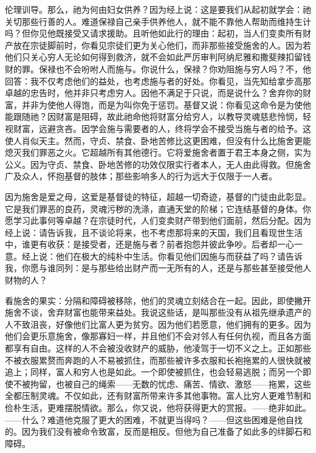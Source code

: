 伦理训导。那么，祂为何由妇女供养？因为经上说：这是要我们从起初就学会：祂关切那些行善的人。难道保禄自己亲手供养他人，就不能不靠他人帮助而维持生计吗？但你见他既接受又请求援助。且听他如此行的理由：起初，当人们变卖所有财产放在宗徒脚前时，你看见宗徒们更为关心他们，而非那些接受施舍的人。因为若他们只关心穷人无论如何得到救济，就不会如此严厉审判阿纳尼雅和撒斐辣扣留钱财的罪。保禄也不会吩咐人而施与。你说什么，保禄？你劝阻施与穷人吗？不，他回答：我不仅考虑他们的益处，也考虑施与者的好处。你看见，当先知给拿步高那卓越的忠告时，他并非只考虑穷人。因他不满足于只说，而是说什么？舍弃你的财富，并非为使他人得饱，而是为叫你免于惩罚。基督又说：你看见这命令是为使他能跟随祂？因财富是阻碍，故此祂命他将财富分给穷人，以教导灵魂慈悲怜悯，轻视财富，远避贪吝。因学会施与需要者的人，终将学会不接受当施与者的给予。这使人肖似天主。然而，守贞、禁食、卧地苦修比这更困难，但没有什么比施舍更能熄灭我们罪恶之火。它超越所有其他德行。它将爱施舍者置于君王本身之侧，实为公义。因为守贞、禁食、卧地苦修的功效仅限实行者本人，无人由此得救。但施舍广及众人，怀抱基督的肢体；那些影响多人的行为远大于仅限于一人者。\par

因为施舍是爱之母，这爱是基督徒的特征，超越一切奇迹，基督的门徒由此彰显。它是我们罪恶的良药，灵魂污秽的洗涤，直通天堂的阶梯；它连结基督的身体。你愿学习此事何等卓越？在宗徒时代，人们变卖财产带到他们面前，然后分配。因为经上说：请告诉我，且不谈论将来，也不考虑那将来的天国，我们且看现世生活中，谁更有收获：是接受者，还是施与者？前者抱怨并彼此争吵。后者却一心一意。经上说：他们在极大的纯朴中生活。你看见他们因施与而获益了吗？请告诉我，你愿与谁同列：是与那些给出财产而一无所有的人，还是与那些甚至接受他人财物的人？\par

看施舍的果实：分隔和障碍被移除，他们的灵魂立刻结合在一起。因此，即使撇开施舍不谈，舍弃财富也能带来益处。我说这些话，是叫那些没有从祖先继承遗产的人不致沮丧，好像他们比富人更为贫穷。因为他们若愿意，他们拥有的更多。因为他们会更乐意施舍，像那寡妇一样，并且他们不会对邻人有任何仇视，而且各方面都享有自由。这样的人不会被没收财产的威胁，他凌驾于一切不义之上。正如那些不被衣服累赘而奔跑的人不易被抓住，而那些被许多衣服和长袍拖累的人很快就被追上；同样，富人和穷人也是如此。一个即使被抓住，也会轻易逃脱；而另一个即使不被拘留，也被自己的绳索——无数的忧虑、痛苦、情欲、激怒——拖累，这些全都压制灵魂。不仅如此，还有财富所带来许多其他事物。富人比穷人更难节制和俭朴生活，更难摆脱情欲。那么，你又说，他将获得更大的赏报。——绝非如此。——什么？难道他克服了更大的困难，不就更当得吗？——但这些困难是他自找的。因为我们没有被命令致富，反而是相反。但他为自己准备了如此多的绊脚石和障碍。\par

